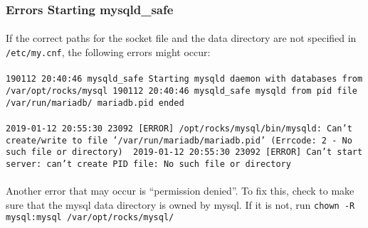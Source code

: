 \documentclass[12pt]{article}
\begin{document}
\subsubsection{Errors Starting mysqld\_safe}
\paragraph{}If the correct paths for the socket file and the data directory are not specified in {\tt/etc/my.cnf}, the following errors might occur: 
\paragraph{}{\tt 190112 20:40:46 mysqld\_safe Starting mysqld daemon with databases from /var/opt/rocks/mysql\
  190112 20:40:46 mysqld\_safe mysqld from pid file /var/run/mariadb/\
  mariadb.pid ended}

\paragraph{} {\tt 2019-01-12 20:55:30 23092 [ERROR] /opt/rocks/mysql/bin/mysqld: Can't create/write to file '/var/run/mariadb/mariadb.pid' (Errcode: 2 - No such file or directory) \
  2019-01-12 20:55:30 23092 [ERROR] Can't start server: can't create PID file: No such file or directory}
\paragraph{}Another error that may occur is ``permission denied''. To fix this, check to make sure that the mysql data directory is owned by mysql. If it is not, run {\tt chown -R mysql:mysql /var/opt/rocks/mysql/ }
\end{document}
